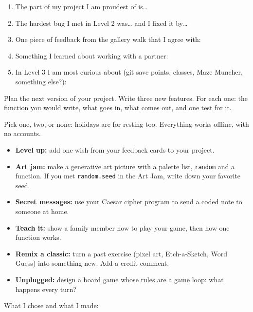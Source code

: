 \namedateline

\begin{core}
\begin{enumerate}
  \item The part of my project I am proudest of is… 
  \item The hardest bug I met in Level 2 was… and I fixed it by… 
  \item One piece of feedback from the gallery walk that I agree with: 
  \item Something I learned about working with a partner: 
  \item In Level 3 I am most curious about (git save points, classes, Maze Muncher, something else?): 
\end{enumerate}
\end{core}

\begin{challenge}
Plan the next version of your project. Write three new features. For each one: the function you
would write, what goes in, what comes out, and one test for it.
\answerspace{4cm}
\end{challenge}

\begin{creative}
Pick one, two, or none: holidays are for resting too. Everything works offline, with no accounts.
\begin{itemize}
  \item \textbf{Level up:} add one wish from your feedback cards to your project.
  \item \textbf{Art jam:} make a generative art picture with a palette list, \texttt{random} and a function. If you met \texttt{random.seed} in the Art Jam, write down your favorite seed.
  \item \textbf{Secret messages:} use your Caesar cipher program to send a coded note to someone at home.
  \item \textbf{Teach it:} show a family member how to play your game, then how one function works.
  \item \textbf{Remix a classic:} turn a past exercise (pixel art, Etch-a-Sketch, Word Guess) into something new. Add a credit comment.
  \item \textbf{Unplugged:} design a board game whose rules are a game loop: what happens every turn?
\end{itemize}
What I chose and what I made: 
\end{creative}

